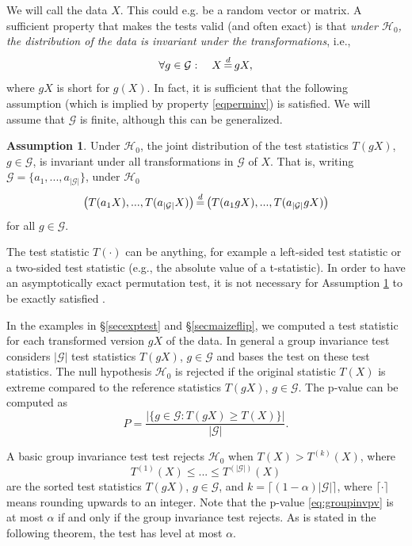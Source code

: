 \documentclass[11pt]{article}
\theoremstyle{plain}
\theoremstyle{definition}
\newtheorem{assumption}{Assumption}[section]
\newcommand{\G}{\mathcal{G}}
\newcommand{\Hy}{\mathcal{H}}
\newcommand{\citp}{\citep}
\begin{document}
We will call the data $X$. This could e.g. be a random vector or matrix. 
A sufficient  property that makes the tests valid (and often exact) is that \emph{under $\Hy_0$, the distribution of the data  is invariant under the transformations}, i.e., 
\begin{equation} \label{eqperminv}
\forall g\in \G: \quad X \,{\buildrel d \over =}\, gX,
\end{equation}
where $gX$ is short for $g(X)$.
In fact, it is sufficient that the following assumption (which is implied by property \eqref{eqperminv}) is satisfied. We will assume that $\G$ is finite, although this can be generalized.
\begin{assumption} \label{assgroupinv}
Under $\Hy_0$, the joint distribution of the test statistics $T(gX)$, $g\in \G$, is invariant under all transformations in $\G$ of $X$. That is, writing $\G=\{a_1,...,a_{|\G|}\}$, under $\Hy_0$
\begin{equation} \label{pinv}
\big(T(a_1X),...,T(a_{|\G|}X)\big)\,{\buildrel d \over =}\, \big(T(a_1gX),...,T(a_{|\G|}gX)\big)
\end{equation}
for all $g\in \G$.
\end{assumption}
The test statistic $T(\cdot)$ can be anything, for example a left-sided test statistic or a two-sided test statistic (e.g., the absolute value of a t-statistic). In order to have an asymptotically exact permutation test, it is not necessary for  Assumption \ref{assgroupinv} to be exactly satisfied \citp{romano1990behavior, canay2017randomization, kashlak2022asymptotic}.

In the examples in  \S\ref{secexptest} and \S\ref{secmaizeflip}, we computed a test statistic for each transformed version $gX$ of the data. In general a group invariance test considers $|\G|$ test statistics $T(gX)$, $g\in \G$ and bases the test on these test statistics. The null hypothesis $\Hy_0$ is rejected if the original statistic
$T(X)$ is extreme compared to the reference statistics $T(gX)$, $g\in \G$.
The p-value can be computed as 
\begin{equation} \label{eq:groupinvpv}
P= \frac{|\{g\in \G: T(gX)\geq T(X)\}|}{|\G|}.
\end{equation}



A basic group invariance test test rejects $\Hy_0$ when $T(X)>T^{(k)}(X)$, where 
$$ T^{(1)}(X)\leq...\leq T^{(|\G|)}(X)$$ are the sorted test statistics $T(gX)$, $g\in \G$, and $k=\lceil (1-\alpha)|\G|\rceil$, where $\lceil\cdot\rceil$ means rounding upwards to an integer. Note that the p-value \eqref{eq:groupinvpv} is at most $\alpha$ if and only if the group invariance test rejects.
 As is  stated in the following theorem, the test has level at most $\alpha$. 
\end{document}
